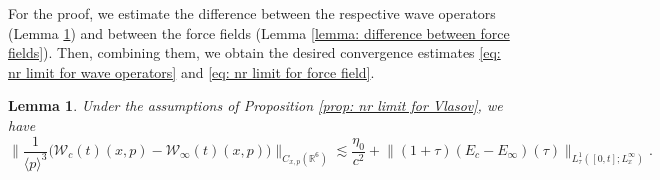 \documentclass[reqno, 11pt, letterpaper]{amsart}
\newtheorem{lemma}[theorem]{Lemma}
\theoremstyle{remark}
\numberwithin{equation}{section}
\numberwithin{theorem}{section}
\numberwithin{table}{section}
\numberwithin{figure}{section}
\begin{document}
For the proof, we estimate the difference between the respective wave operators (Lemma \ref{lemma: primitive bound for the difference between wave operators}) and between the force fields (Lemma \ref{lemma: difference between force fields}). Then, combining them, we obtain the desired convergence estimates \eqref{eq: nr limit for wave operators} and \eqref{eq: nr limit for force field}.

\begin{lemma}\label{lemma: primitive bound for the difference between wave operators}
Under the assumptions of Proposition \ref{prop: nr limit for Vlasov}, we have
$$\Big\|\frac{1}{\langle p\rangle^3}\Big(\mathcal{W}_{c}(t)(x,p)-\mathcal{W}_{\infty}(t)(x,p)\Big)\Big\|_{C_{x,p}(\mathbb{R}^6)}\lesssim \frac{\eta_0}{c^2}+\big\|(1+\tau)(E_c-E_\infty)(\tau)\big\|_{L_{\tau}^1([0,t]; L_x^\infty)}.$$
\end{lemma}
\end{document}
